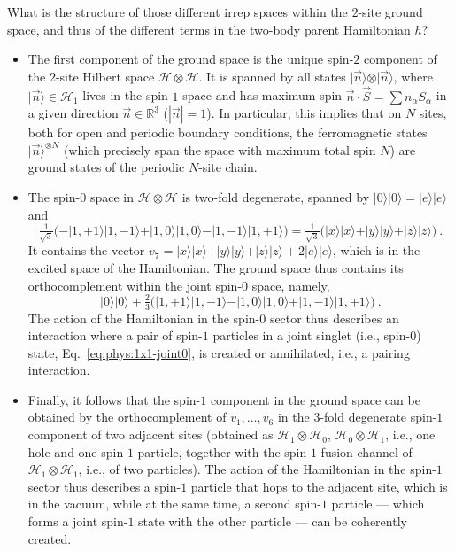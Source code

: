 \documentclass[a4paper]{article}
\newcommand{\ket}[1]{\vert #1 \rangle}
\theoremstyle{definition}
\begin{document}
What is the structure of those different irrep spaces within the $2$-site ground space,
and thus of the different terms in the two-body parent Hamiltonian $h$? 
\begin{itemize}
\item
The first component of the ground space is the unique spin-$2$ component of the
$2$-site Hilbert space $\mathcal H\otimes \mathcal H$. It is spanned by all
states $\ket{\vec n}\otimes \ket{\vec n}$, where $\ket{\vec n}\in\mathcal H_1$
lives in the spin-$1$ space and has maximum spin $\vec n\cdot \vec S = \sum
n_\alpha S_\alpha$ in a given direction $\vec n \in \mathbb R^3$ ($|\vec n|=1$).
In particular, this implies that on $N$ sites, both for open and periodic
boundary conditions, the ferromagnetic states $\ket{\vec n}^{\otimes N}$  (which
precisely span the space with maximum total spin $N$) are ground states of the
periodic $N$-site chain.
\item
The spin-$0$ space in $\mathcal H\otimes \mathcal H$ is two-fold degenerate,
spanned by $\ket{0}\ket{0}=\ket{e}\ket{e}$ and 
\begin{equation}
\label{eq:phys:1x1-joint0}
\tfrac{1}{\sqrt{3}}\bigl(-\ket{1,+1}\ket{1,-1}+\ket{1,0}\ket{1,0}-\ket{1,-1}\ket{1,+1}\bigr)
 = \tfrac{1}{\sqrt{3}}\bigl(\ket{x}\ket{x}+\ket{y}\ket{y}+\ket{z}\ket{z}\bigr)\ .
\end{equation}
It contains the vector
$v_7=\ket{x}\ket{x}+\ket{y}\ket{y}+\ket{z}\ket{z}+2\ket{e}\ket{e}$, which is in
the excited space of the Hamiltonian. The ground space thus contains its
orthocomplement within the joint spin-$0$ space, namely, 
\[
\ket{0}\ket{0} + 
\tfrac{2}{3}\bigl(\ket{1,+1}\ket{1,-1}-\ket{1,0}\ket{1,0}+\ket{1,-1}\ket{1,+1}\bigr)\ .
\]
The action of the Hamiltonian in the spin-$0$ sector thus describes an
interaction where a pair of spin-$1$ particles in a joint singlet (i.e.,
spin-$0$) state,
Eq.~\eqref{eq:phys:1x1-joint0},
is created or annihilated, i.e., a pairing interaction. 
\item 
Finally, it follows that the spin-$1$ component in the ground space can be
obtained by the orthocomplement of $v_1,\dots,v_6$ in the $3$-fold degenerate
spin-$1$ component of two adjacent sites (obtained as $\mathcal H_1\otimes
\mathcal H_0$, $\mathcal H_0\otimes \mathcal H_1$,  i.e., one hole and one
spin-$1$ particle, together with the spin-$1$ fusion channel of $\mathcal
H_1\otimes \mathcal H_1$,  i.e., of two particles). The action of the Hamiltonian in the
spin-$1$ sector thus 
describes a spin-$1$ particle that hops to the adjacent site, which is in the
vacuum, while at the same time, a second spin-$1$ particle  ---
which forms a joint spin-$1$ state with the other particle ---
can be coherently created.
\end{itemize}
\end{document}

